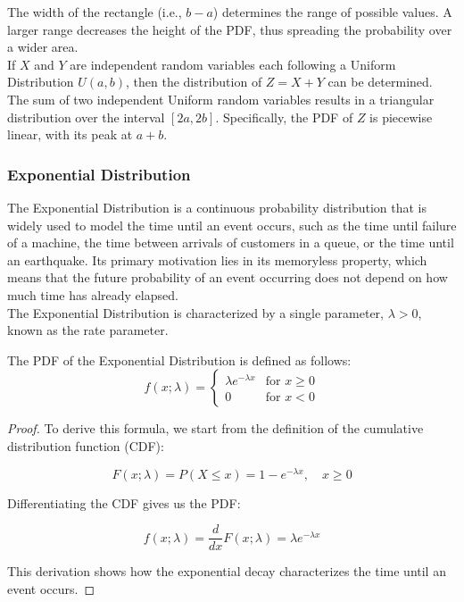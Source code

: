     The width of the rectangle (i.e., \( b - a \)) determines the range of possible values. A larger range decreases the height of the PDF, thus spreading the probability over a wider area. \\

    If \( X \) and \( Y \) are independent random variables each following a Uniform Distribution \( U(a, b) \), then the distribution of \( Z = X + Y \) can be determined. The sum of two independent Uniform random variables results in a triangular distribution over the interval \([2a, 2b]\). Specifically, the PDF of \( Z \) is piecewise linear, with its peak at \( a + b \).

\subsubsection{Exponential Distribution}

The Exponential Distribution is a continuous probability distribution that is widely used to model the time until an event occurs, such as the time until failure of a machine, the time between arrivals of customers in a queue, or the time until an earthquake. Its primary motivation lies in its memoryless property, which means that the future probability of an event occurring does not depend on how much time has already elapsed.\\

The Exponential Distribution is characterized by a single parameter, $\lambda > 0$, known as the rate parameter. 

\begin{definition}
    The PDF of the Exponential Distribution is defined as follows:
\[
f(x; \lambda) = 
\begin{cases} 
\lambda e^{-\lambda x} & \text{for } x \geq 0 \\
0 & \text{for } x < 0 
\end{cases}
\]
\end{definition}

\begin{proof}
    To derive this formula, we start from the definition of the cumulative distribution function (CDF):

\[
F(x; \lambda) = P(X \leq x) = 1 - e^{-\lambda x}, \quad x \geq 0
\]

Differentiating the CDF gives us the PDF:

\[
f(x; \lambda) = \frac{d}{dx}F(x; \lambda) = \lambda e^{-\lambda x}
\]

This derivation shows how the exponential decay characterizes the time until an event occurs.
\end{proof}

